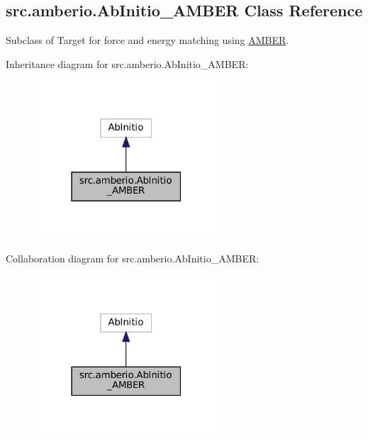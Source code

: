 \hypertarget{classsrc_1_1amberio_1_1AbInitio__AMBER}{}\subsection{src.\+amberio.\+Ab\+Initio\+\_\+\+A\+M\+B\+ER Class Reference}
\label{classsrc_1_1amberio_1_1AbInitio__AMBER}


Subclass of Target for force and energy matching using \hyperlink{classsrc_1_1amberio_1_1AMBER}{A\+M\+B\+ER}.  




Inheritance diagram for src.\+amberio.\+Ab\+Initio\+\_\+\+A\+M\+B\+ER\+:
\nopagebreak
\begin{figure}[H]
\begin{center}
\leavevmode
\includegraphics[width=195pt]{classsrc_1_1amberio_1_1AbInitio__AMBER__inherit__graph}
\end{center}
\end{figure}


Collaboration diagram for src.\+amberio.\+Ab\+Initio\+\_\+\+A\+M\+B\+ER\+:
\nopagebreak
\begin{figure}[H]
\begin{center}
\leavevmode
\includegraphics[width=195pt]{classsrc_1_1amberio_1_1AbInitio__AMBER__coll__graph}
\end{center}
\end{figure}
